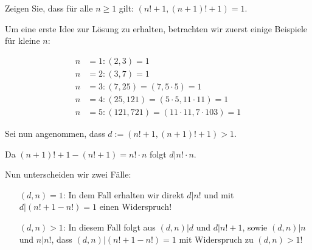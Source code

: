 
\begin{exercise}

Zeigen Sie, dass für alle $n \geq 1$ gilt:
$(n! + 1, (n+1)! + 1) = 1$.

\end{exercise}


\begin{solution}

Um eine erste Idee zur Lösung zu erhalten, betrachten wir
zuerst einige Beispiele für kleine $n$:

\begin{align*}
  n &= 1: (2, 3) = 1 \\
  n &= 2: (3, 7) = 1 \\
  n &= 3: (7, 25) = (7, 5 \cdot 5) = 1 \\
  n &= 4: (25, 121) = (5 \cdot 5, 11 \cdot 11) = 1 \\
  n &= 5: (121, 721) = (11 \cdot 11, 7 \cdot 103) = 1
\end{align*}

Sei nun angenommen, dass $d := (n! + 1, (n+1)! + 1)  > 1$.

Da $(n+1)! + 1 - (n! + 1) = n!\cdot n$ folgt $d | n! \cdot n$.

Nun unterscheiden wir zwei Fälle:

\begin{itemize}
  \item[$(d,n) = 1$:] In dem Fall erhalten wir direkt $d | n!$ und 
  mit $d | (n! + 1 - n!) = 1$ einen Widerspruch!
  \item[$(d,n) > 1$:] In diesem Fall folgt aus $(d,n) | d$ und $d | n! + 1$, 
  sowie $(d,n) | n$ und $n | n!$,
  dass $(d,n) | (n! + 1 - n!) = 1$ mit Widerspruch zu $(d,n) > 1$!
\end{itemize}

\end{solution}

